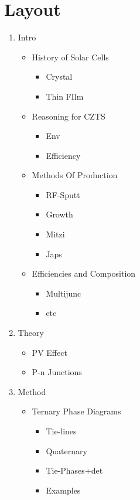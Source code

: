 \documentclass[10pt,a4paper,twoside]{article}
\begin{document}
\section{Layout} %
\label{sec:layout}

\begin{enumerate}
  \item Intro
  \begin{itemize}
    \item History of Solar Cells
    \begin{itemize}
    	\item Crystal
    	\item Thin FIlm
    \end{itemize}
    \item Reasoning for CZTS
    \begin{itemize}
    	\item Env
    	\item Efficiency
    \end{itemize}
    \item Methods Of Production
    \begin{itemize}
    	\item RF-Sputt
    	\item Growth
    	\item Mitzi
    	\item Japs
    \end{itemize}
    \item Efficiencies and Composition
    \begin{itemize}
    	\item Multijunc
    	\item etc
    \end{itemize}
  \end{itemize}
  \item Theory
  \begin{itemize}
  	\item PV Effect
  	\item P-n Junctions 
  \end{itemize}
  \item Method
  \begin{itemize}
  	\item Ternary Phase Diagrams
  	\begin{itemize}
  	 	\item Tie-lines
  	 	\item Quaternary
  	 	\item Tie-Phases+det
  	 	\item Examples

\end{itemize}
\end{itemize}
\end{enumerate}
\end{document}
